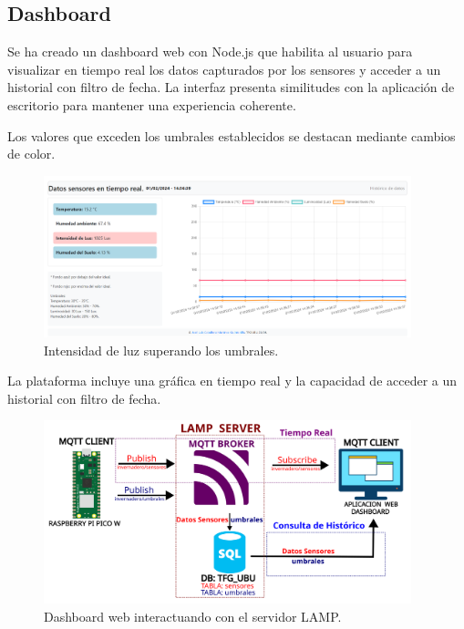 \subsection{Dashboard}\label{proyecto:Dashboard}
Se ha creado un dashboard web con Node.js que habilita al usuario para visualizar en tiempo real los datos capturados por los sensores y acceder a un historial con filtro de fecha. La interfaz presenta similitudes con la aplicación de escritorio para mantener una experiencia coherente.

Los valores que exceden los umbrales establecidos se destacan mediante cambios de color.

\begin{figure}[h]
    \centering
    \includegraphics[width=0.95\textwidth]{img/desarrollo/Dashboard1.png}
    \caption{Intensidad de luz superando los umbrales.} \label{Img:Dashboard1}
\end{figure}

La plataforma incluye una gráfica en tiempo real y la capacidad de acceder a un historial con filtro de fecha.

\begin{figure}[h]
    \centering
    \includegraphics[width=0.95\textwidth]{img/diagramas/mqtt_dashboard.png}
    \caption{Dashboard web interactuando con el servidor LAMP.} \label{Img:mqtt_dashboard}
\end{figure}

